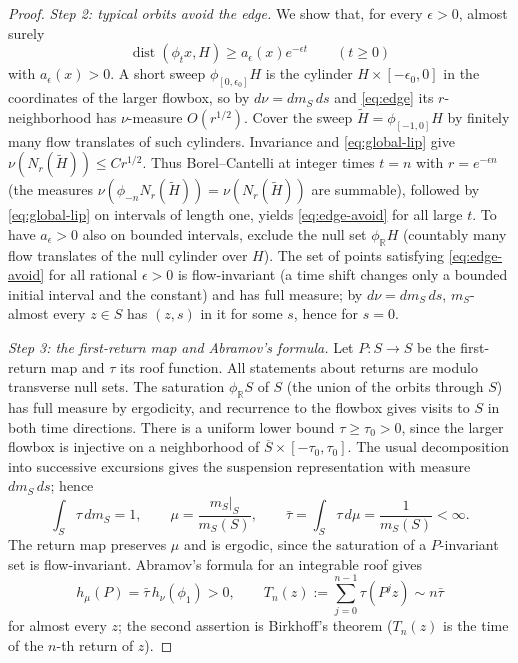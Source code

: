 \documentclass[12pt]{article}
\theoremstyle{remark}
\newcommand{\R}{\mathbb R}
\newcommand{\dist}{\operatorname{dist}}
\begin{document}
\begin{proof}
\emph{Step 2: typical orbits avoid the edge.}
We show that, for every \(\epsilon>0\), almost surely
\begin{equation}\label{eq:edge-avoid}
 \dist(\phi_t x,H)\ge a_\epsilon(x)e^{-\epsilon t}
                     \qquad(t\ge0)
\end{equation}
with \(a_\epsilon(x)>0\).
A short sweep \(\phi_{[0,\epsilon_0]}H\) is the cylinder
\(H\times[-\epsilon_0,0]\) in the coordinates of the larger flowbox,
so by \(d\nu=dm_S\,ds\) and \eqref{eq:edge} its \(r\)-neighborhood has
\(\nu\)-measure \(O(r^{1/2})\).
Cover the sweep \(\widetilde H=\phi_{[-1,0]}H\) by finitely many flow
translates of such cylinders.  Invariance and \eqref{eq:global-lip}
give \(\nu(N_r(\widetilde H))\le C r^{1/2}\).
Thus Borel--Cantelli at integer times \(t=n\) with \(r=e^{-\epsilon n}\)
(the measures \(\nu(\phi_{-n}N_r(\widetilde H))=\nu(N_r(\widetilde H))\)
are summable), followed by \eqref{eq:global-lip} on intervals of
length one, yields \eqref{eq:edge-avoid} for all large \(t\).
To have \(a_\epsilon>0\) also on bounded intervals, exclude the null
set \(\phi_{\R}H\) (countably many flow translates of the null
cylinder over \(H\)).
The set of points satisfying \eqref{eq:edge-avoid} for all rational
\(\epsilon>0\) is flow-invariant (a time shift changes only a bounded
initial interval and the constant) and has full measure; by
\(d\nu=dm_S\,ds\), \(m_S\)-almost every \(z\in S\) has \((z,s)\) in
it for some \(s\), hence for \(s=0\).

\emph{Step 3: the first-return map and Abramov's formula.}
Let \(P:S\to S\) be the first-return map and \(\tau\) its roof function.
All statements about returns are modulo transverse null sets.
The saturation \(\phi_\R S\) of \(S\) (the union of the orbits through
\(S\)) has full measure by ergodicity, and recurrence to the flowbox
gives visits to \(S\) in both time directions.
There is a uniform lower bound \(\tau\ge\tau_0>0\), since the larger
flowbox is injective on a neighborhood of
\(\overline S\times[-\tau_0,\tau_0]\).
The usual decomposition into successive excursions gives the
suspension representation with measure \(dm_S\,ds\); hence
\[
 \int_S\tau\,dm_S=1,\qquad
 \mu=\frac{m_S|_S}{m_S(S)},\qquad
 \bar\tau=\int_S\tau\,d\mu=\frac1{m_S(S)}<\infty.
\]
The return map preserves \(\mu\) and is ergodic, since the saturation
of a \(P\)-invariant set is flow-invariant.
Abramov's formula for an integrable roof \cite{Abramov1959} gives
\begin{equation}\label{eq:abramov}
 h_\mu(P)=\bar\tau\,h_\nu(\phi_1)>0,\qquad
 T_n(z):=\sum_{j=0}^{n-1}\tau(P^jz)\sim n\bar\tau
\end{equation}
for almost every \(z\); the second assertion is Birkhoff's theorem
(\(T_n(z)\) is the time of the \(n\)-th return of \(z\)).


\end{proof}
\end{document}
